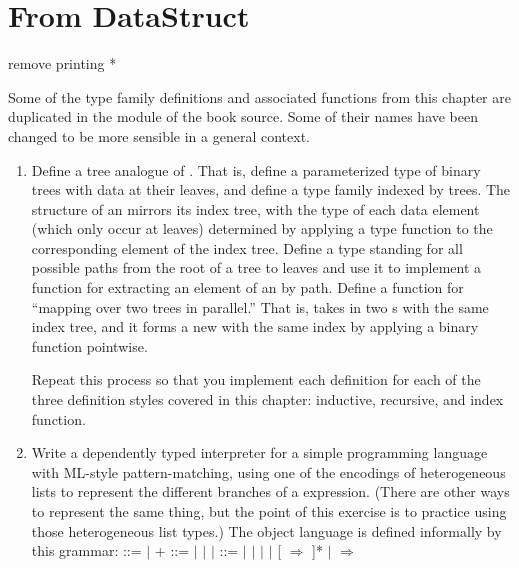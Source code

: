 \documentclass[12pt]{report}
\begin{document}
\section{From DataStruct}



 remove printing * 

 Some of the type family definitions and associated functions from this chapter are duplicated in the  module of the book source.  Some of their names have been changed to be more sensible in a general context.


\begin{enumerate}


\item Define a tree analogue of .  That is, define a parameterized type of binary trees with data at their leaves, and define a type family  indexed by trees.  The structure of an  mirrors its index tree, with the type of each data element (which only occur at leaves) determined by applying a type function to the corresponding element of the index tree.  Define a type standing for all possible paths from the root of a tree to leaves and use it to implement a function  for extracting an element of an  by path.  Define a function  for ``mapping over two trees in parallel.''  That is,  takes in two s with the same index tree, and it forms a new  with the same index by applying a binary function pointwise.


  Repeat this process so that you implement each definition for each of the three definition styles covered in this chapter: inductive, recursive, and index function.


\item Write a dependently typed interpreter for a simple programming language with ML-style pattern-matching, using one of the encodings of heterogeneous lists to represent the different branches of a  expression.  (There are other ways to represent the same thing, but the point of this exercise is to practice using those heterogeneous list types.)  The object language is defined informally by this grammar:
  \coqdoceol
\coqdocemptyline
\coqdocnoindent
{} ::=  \ensuremath{|}  + \coqdoceol
\coqdocnoindent
{} ::=  \ensuremath{|}  \ensuremath{|}   \ensuremath{|}  \coqdoceol
\coqdocnoindent
{} ::=  \ensuremath{|}  \ensuremath{|}   \ensuremath{|}   \ensuremath{|}    [ \ensuremath{\Rightarrow} ]* \ensuremath{|} \coqdocvar{\_} \ensuremath{\Rightarrow} 


\end{enumerate}
\end{document}
